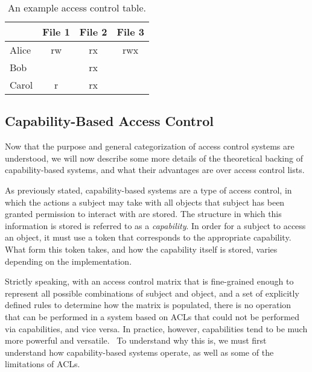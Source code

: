 \begin{table}[t]
  \centering
  \begin{tabular}{|l||c|c|c|}
    \hline
    &File 1&File 2&File 3\\
    \hline
    \hline
    Alice&rw&rx&rwx\\
    \hline
    Bob&&rx&\\
    \hline
    Carol&r&rx&\\
    \hline
  \end{tabular}
  \caption{An example access control table.}
  \label{acmatrix}
\end{table}

\subsection{Capability-Based Access Control}

Now that the purpose and general categorization of access control systems are understood, we will now describe some more details of the theoretical backing of capability-based systems, and what their advantages are over access control lists.

As previously stated, capability-based systems are a type of access control, in which the actions a subject may take with all objects that subject has been granted permission to interact with are stored. The structure in which this information is stored is referred to as a {\em capability}. In order for a subject to access an object, it must use a token that corresponds to the appropriate capability. What form this token takes, and how the capability itself is stored, varies depending on the implementation.

Strictly speaking, with an access control matrix that is fine-grained enough to represent all possible combinations of subject and object, and a set of explicitly defined rules to determine how the matrix is populated, there is no operation that can be performed in a system based on ACLs that could not be performed via capabilities, and vice versa. In practice, however, capabilities tend to be much more powerful and versatile.~\cite{miller2003} To understand why this is, we must first understand how capability-based systems operate, as well as some of the limitations of ACLs.

